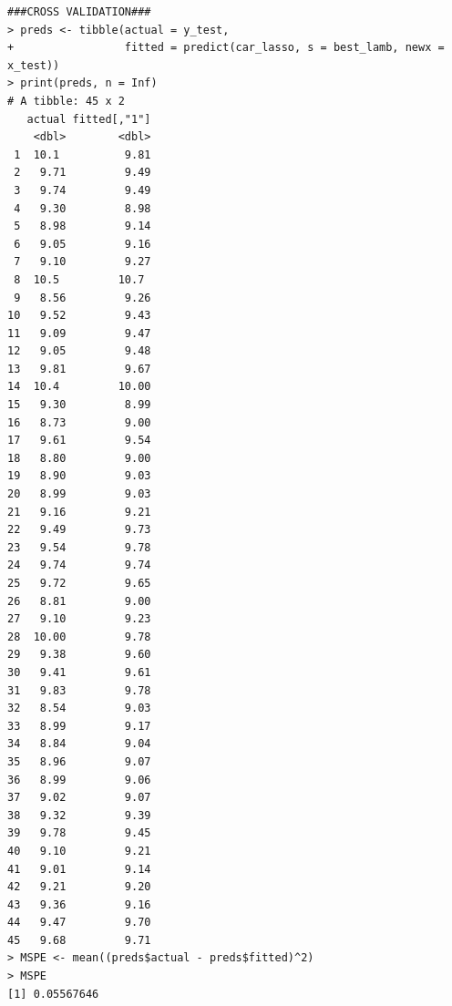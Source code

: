 \documentclass[a4paper, 10pt, titlepage]{article}
\begin{document}
\begin{lstlisting}[basicstyle = \footnotesize \ttfamily]
###CROSS VALIDATION###
> preds <- tibble(actual = y_test, 
+                 fitted = predict(car_lasso, s = best_lamb, newx = x_test))
> print(preds, n = Inf)
# A tibble: 45 x 2
   actual fitted[,"1"]
    <dbl>        <dbl>
 1  10.1          9.81
 2   9.71         9.49
 3   9.74         9.49
 4   9.30         8.98
 5   8.98         9.14
 6   9.05         9.16
 7   9.10         9.27
 8  10.5         10.7 
 9   8.56         9.26
10   9.52         9.43
11   9.09         9.47
12   9.05         9.48
13   9.81         9.67
14  10.4         10.00
15   9.30         8.99
16   8.73         9.00
17   9.61         9.54
18   8.80         9.00
19   8.90         9.03
20   8.99         9.03
21   9.16         9.21
22   9.49         9.73
23   9.54         9.78
24   9.74         9.74
25   9.72         9.65
26   8.81         9.00
27   9.10         9.23
28  10.00         9.78
29   9.38         9.60
30   9.41         9.61
31   9.83         9.78
32   8.54         9.03
33   8.99         9.17
34   8.84         9.04
35   8.96         9.07
36   8.99         9.06
37   9.02         9.07
38   9.32         9.39
39   9.78         9.45
40   9.10         9.21
41   9.01         9.14
42   9.21         9.20
43   9.36         9.16
44   9.47         9.70
45   9.68         9.71
> MSPE <- mean((preds$actual - preds$fitted)^2)
> MSPE
[1] 0.05567646
\end{lstlisting}
\end{document}
